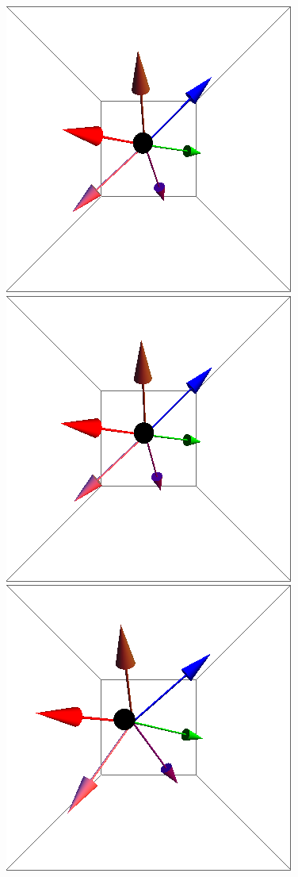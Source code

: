 \documentclass{article}
\begin{document}
\begin{figure}[ht]
\centering
\includegraphics[scale=0.23]{100/1S005to000R.png}
\includegraphics[scale=0.23]{100/41S005to000R.png}
\includegraphics[scale=0.23]{100/46S005to000R.png}

\end{figure}
\end{document}
